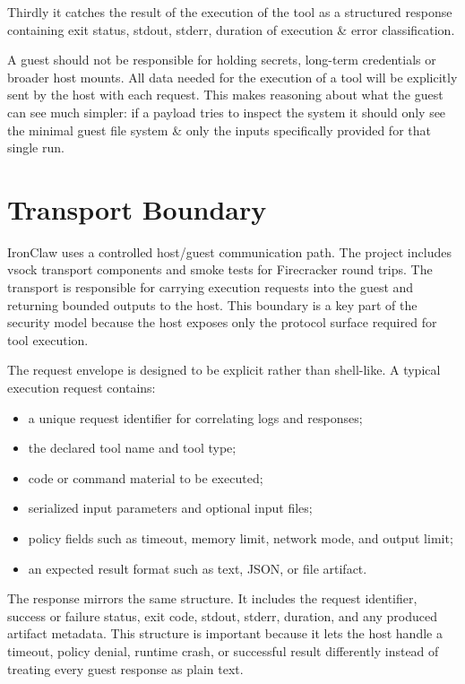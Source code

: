 Thirdly it catches the result of the execution of the tool as a structured response containing exit status, stdout, stderr, duration of execution & error classification.

A guest should not be responsible for holding secrets, long-term credentials or broader host mounts. All data needed for the execution of a tool will be explicitly sent by the host with each request. This makes reasoning about what the guest can see much simpler: if a payload tries to inspect the system it should only see the minimal guest file system & only the inputs specifically provided for that single run.

\section{Transport Boundary}
IronClaw uses a controlled host/guest communication path. The project includes
vsock transport components and smoke tests for Firecracker round trips. The
transport is responsible for carrying execution requests into the guest and
returning bounded outputs to the host. This boundary is a key part of the
security model because the host exposes only the protocol surface required for
tool execution.

The request envelope is designed to be explicit rather than shell-like. A
typical execution request contains:
\begin{itemize}
    \item a unique request identifier for correlating logs and responses;
    \item the declared tool name and tool type;
    \item code or command material to be executed;
    \item serialized input parameters and optional input files;
    \item policy fields such as timeout, memory limit, network mode, and output
    limit;
    \item an expected result format such as text, JSON, or file artifact.
\end{itemize}

The response mirrors the same structure. It includes the request identifier,
success or failure status, exit code, stdout, stderr, duration, and any produced
artifact metadata. This structure is important because it lets the host handle a
timeout, policy denial, runtime crash, or successful result differently instead
of treating every guest response as plain text.

